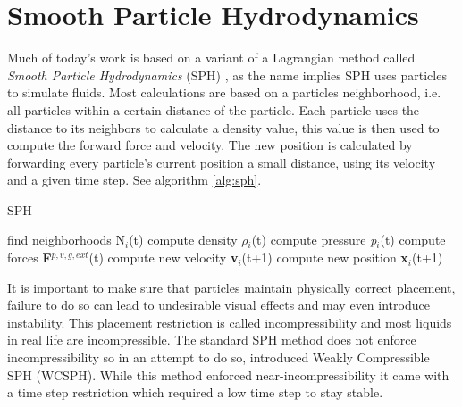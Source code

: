 \documentclass[../../main.tex]{subfiles}
\begin{document}
\tracingall

\label{ch:related}

\section{Smooth Particle Hydrodynamics}
Much of today's work is based on a variant of a Lagrangian method called \textit{Smooth Particle Hydrodynamics} (SPH) \citep{lucy1977numerical, gingold1977smoothed}, as the name implies SPH uses particles to simulate fluids. Most calculations are based on a particles neighborhood, i.e. all particles within a certain distance of the particle. Each particle uses the distance to its neighbors to calculate a density value, this value is then used to compute the forward force and velocity. The new position is calculated by forwarding every particle's current position a small distance, using its velocity and a given time step. See algorithm \ref{alg:sph}. 

\begin{algorithm}[h]
   \caption{SPH}
    \label{alg:sph}
    \begin{algorithmic}[1]
            \State find neighborhoods N$_i$(t)
        \EndFor
            \State compute density \textbf{$\rho$}$_i$(t)
            \State compute pressure \textit{p}$_i$(t)
        \EndFor
            \State compute forces \textbf{F}$^{p, v, g, ext}$(t)
        \EndFor
            \State compute new velocity \textbf{v}$_i$(t+1)
            \State compute new position \textbf{x}$_i$(t+1)
        \EndFor
    \EndWhile
   \end{algorithmic}
\end{algorithm}

It is important to make sure that particles maintain physically correct placement, failure to do so can lead to undesirable visual effects and may even introduce instability. This placement restriction is called incompressibility and most liquids in real life are incompressible. The standard SPH method \citep{lucy1977numerical, gingold1977smoothed} does not enforce incompressibility so in an attempt to do so, \citet{becker2007weakly} introduced Weakly Compressible SPH (WCSPH). While this method enforced near-incompressibility it came with a time step restriction which required a low time step to stay stable.
\end{document}
